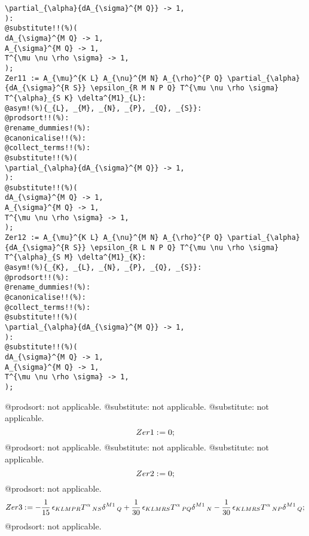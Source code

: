 \documentclass[11pt]{article}
\def\specialcolon{\mathrel{\mathop{:}}\hspace{-.5em}}
\begin{document}
{\begin{verbatim}
\partial_{\alpha}{dA_{\sigma}^{M Q}} -> 1,
):
@substitute!!(%)(
dA_{\sigma}^{M Q} -> 1,
A_{\sigma}^{M Q} -> 1,
T^{\mu \nu \rho \sigma} -> 1,
);
Zer11 := A_{\mu}^{K L} A_{\nu}^{M N} A_{\rho}^{P Q} \partial_{\alpha}{dA_{\sigma}^{R S}} \epsilon_{R M N P Q} T^{\mu \nu \rho \sigma} T^{\alpha}_{S K} \delta^{M1}_{L}:
@asym!(%){_{L}, _{M}, _{N}, _{P}, _{Q}, _{S}}:
@prodsort!!(%):
@rename_dummies!(%):
@canonicalise!!(%):
@collect_terms!!(%):
@substitute!!(%)(
\partial_{\alpha}{dA_{\sigma}^{M Q}} -> 1,
):
@substitute!!(%)(
dA_{\sigma}^{M Q} -> 1,
A_{\sigma}^{M Q} -> 1,
T^{\mu \nu \rho \sigma} -> 1,
);
Zer12 := A_{\mu}^{K L} A_{\nu}^{M N} A_{\rho}^{P Q} \partial_{\alpha}{dA_{\sigma}^{R S}} \epsilon_{R L N P Q} T^{\mu \nu \rho \sigma} T^{\alpha}_{S M} \delta^{M1}_{K}:
@asym!(%){_{K}, _{L}, _{N}, _{P}, _{Q}, _{S}}:
@prodsort!!(%):
@rename_dummies!(%):
@canonicalise!!(%):
@collect_terms!!(%):
@substitute!!(%)(
\partial_{\alpha}{dA_{\sigma}^{M Q}} -> 1,
):
@substitute!!(%)(
dA_{\sigma}^{M Q} -> 1,
A_{\sigma}^{M Q} -> 1,
T^{\mu \nu \rho \sigma} -> 1,
);
\end{verbatim}}
@prodsort: not applicable.
@substitute: not applicable.
@substitute: not applicable.
\begin{dmath*}[compact, spread=2pt]
Zer1\specialcolon{}= 0;
\end{dmath*}
@prodsort: not applicable.
@substitute: not applicable.
@substitute: not applicable.
\begin{dmath*}[compact, spread=2pt]
Zer2\specialcolon{}= 0;
\end{dmath*}
@prodsort: not applicable.
\begin{dmath*}[compact, spread=2pt]
Zer3\specialcolon{}=  - \frac{1}{15}\, {\epsilon}_{K L M P R} {T}^{\alpha}\,_{N S} {\delta}^{M1}\,_{Q} + \frac{1}{30}\, {\epsilon}_{K L M R S} {T}^{\alpha}\,_{P Q} {\delta}^{M1}\,_{N} - \frac{1}{30}\, {\epsilon}_{K L M R S} {T}^{\alpha}\,_{N P} {\delta}^{M1}\,_{Q};
\end{dmath*}
@prodsort: not applicable.
\end{document}
